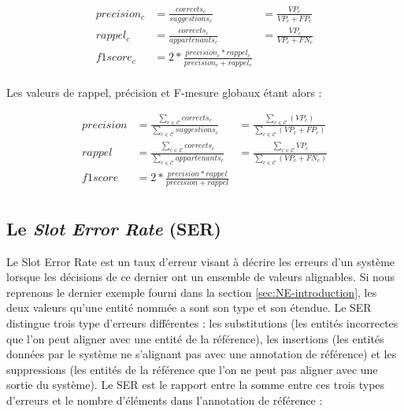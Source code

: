 \documentclass[PhD-Yoann-Dupont.tex]{subfiles}
\begin{document}
\begin{equation}\label{eq:f1score-one-class}
\begin{aligned}
precision_{c} &= \frac{corrects_{c}}{suggestions_{c}} &= \frac{VP_{c}}{VP_{c} + FP_{c}}\\
rappel_{c} &= \frac{corrects_{c}}{appartenants_{c}} &= \frac{VP_{c}}{VP_{c} + FN_{c}} \\
f1score_{c} &= 2 * \frac{precision_{c} * rappel_{c}}{precision_{c} + rappel_{c}} \\
\end{aligned}
\end{equation}

Les valeurs de rappel, précision et F-mesure globaux étant alors :

\begin{equation}\label{eq:f1score-global}
\begin{aligned}
precision &= \frac{\sum_{c \in \mathcal{C}} corrects_{c}}{\sum_{c \in \mathcal{C}} suggestions_{c}} &= \frac{\sum_{c \in \mathcal{C}} (VP_{c})}{\sum_{c \in \mathcal{C}} (VP_{c} + FP_{c})} \\
rappel &= \frac{\sum_{c \in \mathcal{C}} corrects_{c}}{\sum_{c \in \mathcal{C}} appartenants_{c}} &= \frac{\sum_{c \in \mathcal{C}} VP_{c}}{\sum_{c \in \mathcal{C}} (VP_{c} + FN_{c})} \\
f1score &= 2 * \frac{precision * rappel}{precision + rappel} \\
\end{aligned}
\end{equation}

\subsection{Le \emph{Slot Error Rate} (SER)}
\label{subsec:SER}

Le Slot Error Rate \citep{makhoul1999performance} est un taux d'erreur visant à décrire les erreurs d'un système lorsque les décisions de ce dernier ont un ensemble de valeurs alignables. Si nous reprenons le dernier exemple fourni dans la section \ref{sec:NE-introduction}, les deux valeurs qu'une entité nommée a sont son type et son étendue. Le SER distingue trois type d'erreurs différentes : les substitutions (les entités incorrectes que l'on peut aligner avec une entité de la référence), les insertions (les entités données par le système ne s'alignant pas avec une annotation de référence) et les suppressions (les entités de la référence que l'on ne peut pas aligner avec une sortie du système). Le SER est le rapport entre la somme entre ces trois types d'erreurs et le nombre d'éléments dans l'annotation de référence :
\end{document}

